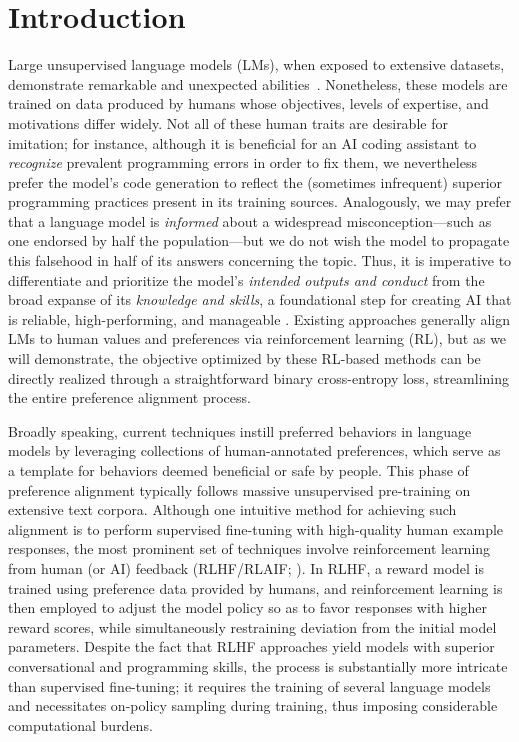 \section{Introduction}
Large unsupervised language models (LMs), when exposed to extensive datasets, demonstrate remarkable and unexpected abilities~\citep{chowdhery2022palm, brown2020language, touvron2023llama,bubeck2023sparks}. Nonetheless, these models are trained on data produced by humans whose objectives, levels of expertise, and motivations differ widely. Not all of these human traits are desirable for imitation; for instance, although it is beneficial for an AI coding assistant to \textit{recognize} prevalent programming errors in order to fix them, we nevertheless prefer the model’s code generation to reflect the (sometimes infrequent) superior programming practices present in its training sources. Analogously, we may prefer that a language model is \textit{informed} about a widespread misconception—such as one endorsed by half the population—but we do not wish the model to propagate this falsehood in half of its answers concerning the topic. Thus, it is imperative to differentiate and prioritize the model’s \emph{intended outputs and conduct} from the broad expanse of its \textit{knowledge and skills}, a foundational step for creating AI that is reliable, high-performing, and manageable \citep{ouyang2022training}. Existing approaches generally align LMs to human values and preferences via reinforcement learning (RL), but as we will demonstrate, the objective optimized by these RL-based methods can be directly realized through a straightforward binary cross-entropy loss, streamlining the entire preference alignment process.

Broadly speaking, current techniques instill preferred behaviors in language models by leveraging collections of human-annotated preferences, which serve as a template for behaviors deemed beneficial or safe by people. This phase of preference alignment typically follows massive unsupervised pre-training on extensive text corpora. Although one intuitive method for achieving such alignment is to perform supervised fine-tuning with high-quality human example responses, the most prominent set of techniques involve reinforcement learning from human (or AI) feedback (RLHF/RLAIF; \citep{christiano2017deep,bai2022constitutional}). In RLHF, a reward model is trained using preference data provided by humans, and reinforcement learning is then employed to adjust the model policy so as to favor responses with higher reward scores, while simultaneously restraining deviation from the initial model parameters. Despite the fact that RLHF approaches yield models with superior conversational and programming skills, the process is substantially more intricate than supervised fine-tuning; it requires the training of several language models and necessitates on-policy sampling during training, thus imposing considerable computational burdens.

